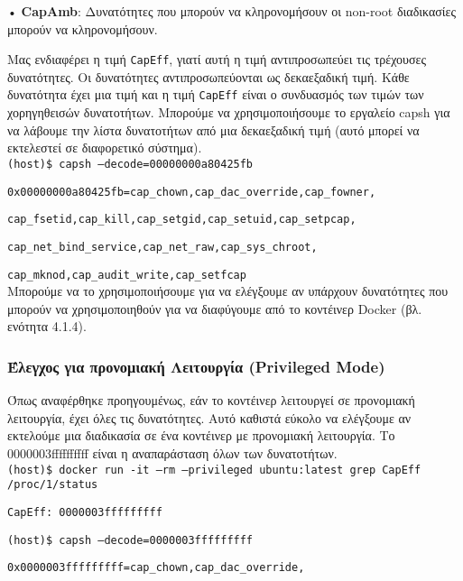 • \textlatin{\textbf{CapAmb}}: Δυνατότητες που μπορούν να κληρονομήσουν οι
\textlatin{non-root} διαδικασίες μπορούν να κληρονομήσουν.


Μας ενδιαφέρει η τιμή \texttt{\textlatin{CapEff}}, γιατί αυτή η τιμή
αντιπροσωπεύει τις τρέχουσες δυνατότητες. Οι δυνατότητες αντιπροσωπεύονται ως
δεκαεξαδική τιμή. Κάθε δυνατότητα έχει μια τιμή και η τιμή
\texttt{\textlatin{CapEff}} είναι ο συνδυασμός
των τιμών των χορηγηθεισών δυνατοτήτων. Μπορούμε να χρησιμοποιήσουμε το εργαλείο
\textlatin{capsh} για να λάβουμε την λίστα δυνατοτήτων από μια δεκαεξαδική τιμή
(αυτό μπορεί να εκτελεστεί σε διαφορετικό σύστημα). \\

\texttt{\textlatin{(host)\$ capsh --decode=00000000a80425fb}}

\texttt{\textlatin{0x00000000a80425fb=cap\_chown,cap\_dac\_override,cap\_fowner,}}

\texttt{\textlatin{cap\_fsetid,cap\_kill,cap\_setgid,cap\_setuid,cap\_setpcap,}}

\texttt{\textlatin{cap\_net\_bind\_service,cap\_net\_raw,cap\_sys\_chroot,}}

\texttt{\textlatin{cap\_mknod,cap\_audit\_write,cap\_setfcap}} \\


Μπορούμε να το χρησιμοποιήσουμε για να ελέγξουμε αν υπάρχουν δυνατότητες που
μπορούν να χρησιμοποιηθούν για να διαφύγουμε από το κοντέινερ \textlatin{Docker}
(βλ. ενότητα 4.1.4).


\subsubsection{Έλεγχος για προνομιακή Λειτουργία (\textlatin{Privileged Mode})}

Όπως αναφέρθηκε προηγουμένως, εάν το κοντέινερ λειτουργεί σε προνομιακή
λειτουργία, έχει όλες τις δυνατότητες. Αυτό καθιστά εύκολο να ελέγξουμε αν
εκτελούμε μια διαδικασία σε ένα κοντέινερ με προνομιακή λειτουργία.
Το 0000003ffffffffff είναι η αναπαράσταση όλων των δυνατοτήτων. \\

\texttt{\textlatin{(host)\$ docker run -it --rm --privileged ubuntu:latest grep CapEff /proc/1/status}}

\texttt{\textlatin{CapEff: 0000003fffffffff}}

\texttt{\textlatin{(host)\$ capsh --decode=0000003fffffffff}}

\texttt{\textlatin{0x0000003fffffffff=cap\_chown,cap\_dac\_override,}}

